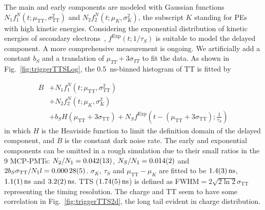 The main and early components are modeled with Gaussian functions %
$N_1f_1^N(t;\mu_{\mathrm{TT}},\sigma_{\mathrm{TT}}^2)$ and $N_2f_2^N(t;\mu_K,\sigma_K^2)$, the subscript $K$ standing for PEs with high kinetic energies. Considering the exponential distribution of kinetic energies of secondary electrons~\cite{Furman,SecondElectron}, $f^\mathrm{Exp}(t;1/\tau_S)$ is suitable to model the delayed component.  A more comprehensive measurement is ongoing.  We artificially add a constant $b_S$ and a translation of $\mu_{TT} + 3\sigma_{TT}$ to fit the data. As shown in Fig.~\ref{fig:triggerTTSLog}, the \SI{0.5}{ns}-binned histogram of $\mathrm{TT}$ is fitted by

\begin{equation}
    \begin{aligned}
        B&+N_1f_1^N(t;\mu_{\mathrm{TT}},\sigma_{\mathrm{TT}}^2)\\
        &+N_2f_2^N(t;\mu_K,\sigma_K^2)\\
        &+b_SH(\mu_{\mathrm{TT}}+3\sigma_{\mathrm{TT}})+N_Sf^{\mathrm{Exp}}\left(t-(\mu_{\mathrm{TT}}+3\sigma_{\mathrm{TT}});\frac{1}{\tau_S}\right)
    \end{aligned}
\end{equation}
in which $H$ is the Heaviside function to limit the definition domain of the delayed component, and $B$ is the constant dark noise rate. The early and exponential components can be omitted in a rough simulation due to their small ratios in the 9 MCP-PMTs: $N_2/N_1 = \num{0.042\pm0.013}$, $N_S/N_1 = \num{0.014\pm0.002}$ and $2b_S\sigma_{\mathrm{TT}}/N_1 l= \num{0.00028\pm0.00005}$.  $\sigma_K$, $\tau_S$ and $\mu_{\mathrm{TT}}-\mu_K$ are fitted to be $\SI{1.4 \pm 0.3}{ns}$, $\SI{1.1\pm 0.1}{ns}$ and $\SI{3.2\pm 0.2}{ns}$. TTS ($\SI{1.74\pm0.05}{ns}$) is defined as FWHM$=2\sqrt{2\ln 2}\sigma_{\mathrm{TT}}$~\cite{HAMAMATSUManual} representing the timing resolution. The charge and TT seem to have some correlation in Fig.~\ref{fig:triggerTTS2d}, the long tail evident in charge distribution.

